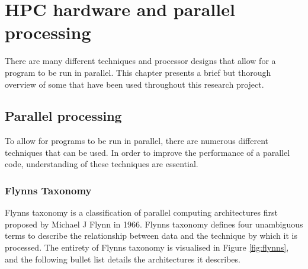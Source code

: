 \documentclass[a4paper,11pt]{report}
\begin{document}
\chapter{HPC hardware and parallel processing}
There are many different techniques and processor designs that allow for a program to be run in parallel. This chapter presents a brief but thorough overview of some that have been used throughout this research project. 

\section{Parallel processing}
To allow for programs to be run in parallel, there are numerous different techniques that can be used. In order to improve the performance of a parallel code, understanding of these techniques are essential.

\subsection{Flynns Taxonomy}
Flynns taxonomy is a classification of parallel computing architectures first proposed by Michael J Flynn in 1966. Flynns taxonomy defines four unambiguous terms to describe the relationship between data and the technique by which it is processed. The entirety of Flynns taxonomy is visualised in Figure \ref{fig:flynns}, and the following bullet list details the architectures it describes.
\end{document}
